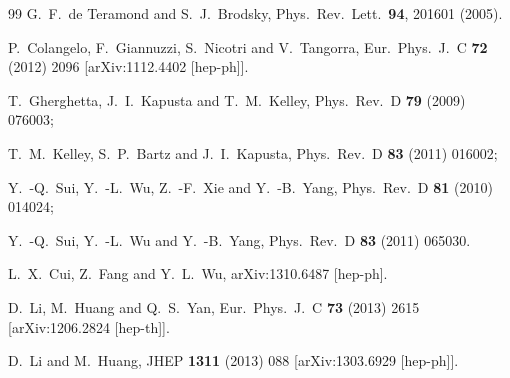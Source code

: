 \documentclass[aps,prd,showpacs,preprintnumbers,twocolumn]{revtex4}
\begin{document}
\begin{thebibliography}{99}
  G.~F.~de Teramond and S.~J.~Brodsky,
Phys.\ Rev.\ Lett.\ \textbf{94}, 201601 (2005). %


  P.~Colangelo, F.~Giannuzzi, S.~Nicotri and V.~Tangorra,
  Eur.\ Phys.\ J.\ C {\bf 72} (2012) 2096  [arXiv:1112.4402 [hep-ph]].


T.~Gherghetta, J.~I.~Kapusta and T.~M.~Kelley,
Phys.\ Rev.\ D {\bf 79} (2009) 076003; %

T.~M.~Kelley, S.~P.~Bartz and J.~I.~Kapusta,
  Phys.\ Rev.\ D {\bf 83} (2011) 016002;

  Y.~-Q.~Sui, Y.~-L.~Wu, Z.~-F.~Xie and Y.~-B.~Yang,
  Phys.\ Rev.\ D {\bf 81} (2010) 014024;  %

Y.~-Q.~Sui, Y.~-L.~Wu and Y.~-B.~Yang,
  Phys.\ Rev.\ D {\bf 83} (2011) 065030.  %

  L.~X.~Cui, Z.~Fang and Y.~L.~Wu,
  arXiv:1310.6487 [hep-ph].

  D.~Li, M.~Huang and Q.~S.~Yan,
  Eur.\ Phys.\ J.\ C {\bf 73} (2013) 2615
  [arXiv:1206.2824 [hep-th]].


  D.~Li and M.~Huang,
  JHEP {\bf 1311} (2013) 088
  [arXiv:1303.6929 [hep-ph]].


\end{thebibliography}
\end{document}

